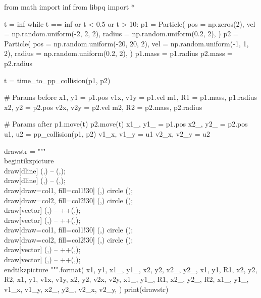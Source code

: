 \documentclass{standalone}
\begin{document}

\begin{pycode}
from math import inf
from libpq import *

t = inf
while t == inf or t < 0.5 or t > 10:
		p1 = Particle(
						pos = np.zeros(2),
						vel = np.random.uniform(-2, 2, 2),
						radius = np.random.uniform(0.2, 2),
						)
		p2 = Particle(
						pos = np.random.uniform(-20, 20, 2),
						vel = np.random.uniform(-1, 1, 2),
						radius = np.random.uniform(0.2, 2),
						)
		p1.mass = p1.radius
		p2.mass = p2.radius

		t = time_to_pp_collision(p1, p2)

# Params before
x1, y1 = p1.pos
v1x, v1y = p1.vel
m1, R1 = p1.mass, p1.radius
x2, y2 = p2.pos
v2x, v2y = p2.vel
m2, R2 = p2.mass, p2.radius

# Params after
p1.move(t)
p2.move(t)
x1_, y1_ = p1.pos
x2_, y2_ = p2.pos
u1, u2 = pp_collision(p1, p2)
v1_x, v1_y = u1
v2_x, v2_y = u2

drawstr = """
\\begin{{tikzpicture}}
	\\draw[dline] ({},{}) -- ({},{});
	\\draw[dline] ({},{}) -- ({},{});
	\\draw[draw=col1, fill=col1!30] ({},{}) circle ({});
	\\draw[draw=col2, fill=col2!30] ({},{}) circle ({});
	\\draw[vector] ({},{}) -- ++({},{});
	\\draw[vector] ({},{}) -- ++({},{});
	\\draw[draw=col1, fill=col1!30] ({},{}) circle ({});
	\\draw[draw=col2, fill=col2!30] ({},{}) circle ({});
	\\draw[vector] ({},{}) -- ++({},{});
	\\draw[vector] ({},{}) -- ++({},{});
\\end{{tikzpicture}}
""".format(
						x1, y1, x1_, y1_,
						x2, y2, x2_, y2_,
						x1, y1, R1,
						x2, y2, R2,
						x1, y1, v1x, v1y,
						x2, y2, v2x, v2y,
						x1_, y1_, R1,
						x2_, y2_, R2,
						x1_, y1_, v1_x, v1_y,
						x2_, y2_, v2_x, v2_y,
					)
print(drawstr)
\end{pycode}
\end{document}
